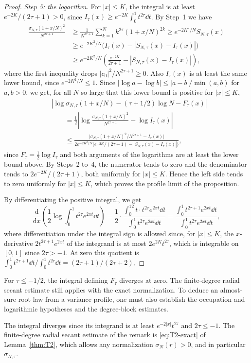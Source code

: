 \begin{proof}
\emph{Step 5: the logarithm.}
For $|x|\leq K$, the integral is at least $e^{-2K}/(2\tau+1)>0$, since
$I_\tau(x)\geq e^{-2K}\int_0^1t^{2\tau}\dd t$. By Step~1 we have
\begin{align*}
 \frac{\sigma_{N,\tau}(1+x/N)^2}{N^{2\tau+1}}
 &\geq\frac1{N^{2\tau+1}}\sum_{k=1}^Nk^{2\tau}(1+x/N)^{2k}
 \geq e^{-2K^2/N}S_{N,\tau}(x)\\
 &\geq e^{-2K^2/N}\bigl(I_\tau(x)-|S_{N,\tau}(x)-I_\tau(x)|\bigr)\\
 &\geq e^{-2K^2/N}\left(\frac{e^{-2K}}{2\tau+1}
      -|S_{N,\tau}(x)-I_\tau(x)|\right),
\end{align*}
where the first inequality drops $|c_0|^2/N^{2\tau+1}\geq0$.
Also $I_\tau(x)$ is at least the same lower bound, since
$e^{-2K^2/N}\leq1$. Since
$|\log a-\log b|\leq|a-b|/\min(a,b)$ for $a,b>0$, we get, for all $N$
so large that this lower bound is positive for $|x|\leq K$,
\begin{align*}
 &\left|\log\sigma_{N,\tau}(1+x/N)-(\tau+1/2)\log N-F_\tau(x)\right|\\
 &\qquad=\frac12\left|\log\frac{\sigma_{N,\tau}(1+x/N)^2}{N^{2\tau+1}}
    -\log I_\tau(x)\right|\\
 &\qquad\leq\frac{\bigl|\sigma_{N,\tau}(1+x/N)^2/N^{2\tau+1}-I_\tau(x)\bigr|}
   {2e^{-2K^2/N}\bigl(e^{-2K}/(2\tau+1)-|S_{N,\tau}(x)-I_\tau(x)|\bigr)},
\end{align*}
since $F_\tau=\frac12\log I_\tau$ and both arguments of the logarithms are
at least the lower bound above.
By Steps~2 to~4, the numerator tends to zero and the denominator tends
to $2e^{-2K}/(2\tau+1)$, both uniformly for $|x|\leq K$. Hence the left
side tends to zero uniformly for $|x|\le K$, which proves the profile
limit of the proposition.

By differentiating the positive integral, we get
\[
 \frac{\mathrm d}{\mathrm dx}\left(\frac12\log
                \int_0^1t^{2\tau}e^{2xt}\dd t\right)
 =\frac12\cdot\frac{\int_0^12t\cdot t^{2\tau}e^{2xt}\dd t}
        {\int_0^1t^{2\tau}e^{2xt}\dd t}
 =\frac{\int_0^1t^{2\tau+1}e^{2xt}\dd t}
        {\int_0^1t^{2\tau}e^{2xt}\dd t},
\]
where differentiation under the integral sign is allowed since, for
$|x|\leq K$, the $x$-derivative $2t^{2\tau+1}e^{2xt}$ of the integrand is
at most $2e^{2K}t^{2\tau}$, which is integrable on $[0,1]$ since
$2\tau>-1$. At zero this quotient is
$\int_0^1t^{2\tau+1}\dd t/\int_0^1t^{2\tau}\dd t=(2\tau+1)/(2\tau+2)$.
\end{proof}

\begin{remark}\label{rem:weighted-divergence}
For $\tau\leq-1/2$, the integral defining $F_\tau$ diverges at zero.
The finite-degree radial secant estimate still applies with the exact
normalization. To deduce an almost-sure root law from a variance profile,
one must also establish the occupation and logarithmic hypotheses and
the degree-block estimates.
\end{remark}
The integral diverges since its integrand is at least
$e^{-2|x|}t^{2\tau}$ and $2\tau\leq-1$. The finite-degree radial secant
estimate of the remark is \eqref{eq:T2-exact} of Lemma~\ref{thm:T2},
which allows any normalization $\sigma_N(r)>0$, and in particular
$\sigma_{N,\tau}$.


